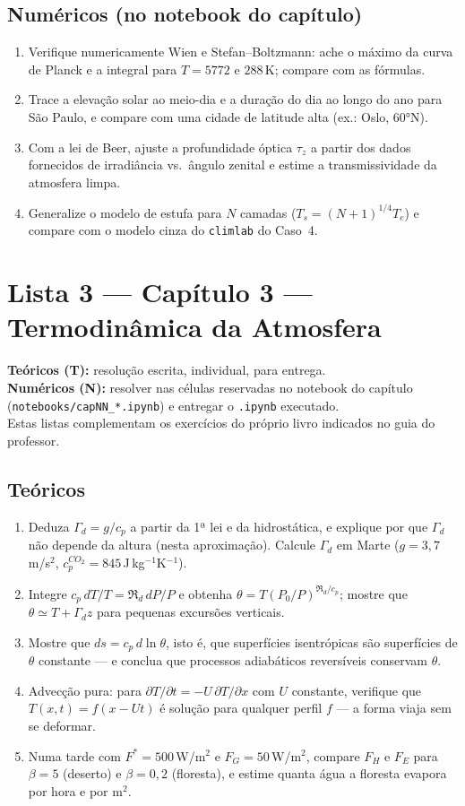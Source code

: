 \documentclass[11pt]{article}
\newcommand{\instrucoes}{%
\begin{caixalista}
\textbf{Teóricos (T):} resolução escrita, individual, para entrega.\\
\textbf{Numéricos (N):} resolver nas células reservadas no notebook do
capítulo (\texttt{notebooks/capNN\_*.ipynb}) e entregar o
\texttt{.ipynb} executado.\\
Estas listas complementam os exercícios do próprio livro indicados no
guia do professor.
\end{caixalista}}
\begin{document}
\subsection*{Numéricos (no notebook do capítulo)}

\begin{enumerate}[label=\textbf{N\arabic*.},itemsep=4pt]
  \item Verifique numericamente Wien e Stefan--Boltzmann: ache o máximo da
        curva de Planck e a integral para $T = 5772$ e $288$\,K; compare
        com as fórmulas.
  \item Trace a elevação solar ao meio-dia e a duração do dia ao longo do
        ano para São Paulo, e compare com uma cidade de latitude alta
        (ex.: Oslo, $60°$N).
  \item Com a lei de Beer, ajuste a profundidade óptica $\tau_z$ a partir
        dos dados fornecidos de irradiância vs.\ ângulo zenital e estime a
        transmissividade da atmosfera limpa.
  \item Generalize o modelo de estufa para $N$ camadas
        ($T_s = (N{+}1)^{1/4}T_e$) e compare com o modelo cinza do
        \texttt{climlab} do Caso~4.
\end{enumerate}

\clearpage
\section*{Lista 3 --- Capítulo 3 --- Termodinâmica da Atmosfera}
\instrucoes

\subsection*{Teóricos}

\begin{enumerate}[label=\textbf{T\arabic*.},itemsep=4pt]
  \item Deduza $\Gamma_d = g/c_p$ a partir da 1ª lei e da hidrostática, e
        explique por que $\Gamma_d$ não depende da altura (nesta
        aproximação). Calcule $\Gamma_d$ em Marte
        ($g = 3{,}7$\,m/s$^2$, $c_p^{CO_2} = 845$\,J\,kg$^{-1}$K$^{-1}$).
  \item Integre $c_p\,dT/T = \Re_d\,dP/P$ e obtenha
        $\theta = T(P_0/P)^{\Re_d/c_p}$; mostre que
        $\theta \simeq T + \Gamma_d z$ para pequenas excursões verticais.
  \item Mostre que $ds = c_p\,d\ln\theta$, isto é, que superfícies
        isentrópicas são superfícies de $\theta$ constante — e conclua que
        processos adiabáticos reversíveis conservam $\theta$.
  \item Advecção pura: para
        $\partial T/\partial t = -U\,\partial T/\partial x$ com $U$
        constante, verifique que $T(x,t) = f(x-Ut)$ é solução para
        qualquer perfil $f$ — a forma viaja sem se deformar.
  \item Numa tarde com $F^* = 500$\,W/m$^2$ e $F_G = 50$\,W/m$^2$, compare
        $F_H$ e $F_E$ para $\beta = 5$ (deserto) e $\beta = 0{,}2$
        (floresta), e estime quanta água a floresta evapora por hora e
        por m$^2$.
\end{enumerate}
\end{document}
